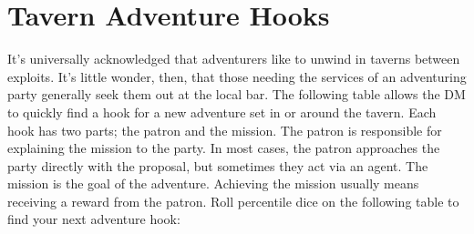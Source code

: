 \documentclass[10pt,a4paper,twoside,twocolumn,openany,bg=print,nodeprecatedcode]{dndbook}
\begin{document}
\section{Tavern Adventure Hooks}
It's universally acknowledged that adventurers like to unwind in taverns between exploits. It's little wonder, then, that those needing the services of an adventuring party generally seek them out at the local bar.
The following table allows the DM to quickly find a hook for a new adventure set in or around the tavern. Each hook has two parts; the patron and the mission. The patron is responsible for explaining the mission to the party. In most cases, the patron approaches the party directly with the proposal, but sometimes they act via an agent. The mission is the goal of the adventure. Achieving the mission usually means receiving a reward from the patron.
Roll percentile dice on the following table to find your next adventure hook:
\end{document}
